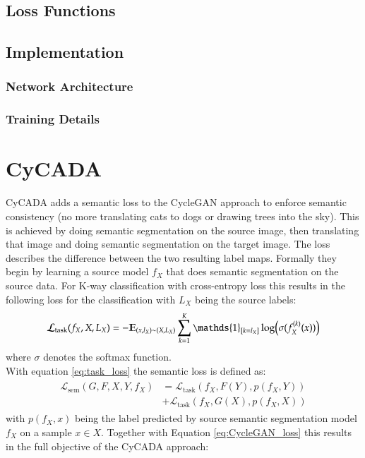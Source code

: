 \subsection{Loss Functions}
\subsection{Implementation}
\subsubsection{Network Architecture}
\subsubsection{Training Details}


\section{CyCADA} 
CyCADA \cite{DBLP:journals/corr/abs-1711-03213} adds a semantic loss to the CycleGAN approach to enforce semantic consistency (no more translating cats to dogs or drawing trees into the sky). This is achieved by doing semantic segmentation on the source image, then translating that image and doing semantic segmentation on the target image. The loss describes the difference between the two resulting label maps. Formally they begin by learning a source model $f_X$ that does semantic segmentation on the source data. For K-way classification with cross-entropy loss this results in the following loss for the classification with $L_X$ being the source labels:
\begin{align}
	\mathcal{L}_{\text{task}}(f_X, X, L_X) = -\mathbb{E}_{(x, l_X)\sim(X, L_X)}\sum_{k=1}^{K}\mathds{1}_{[k=l_X]}\log\Bigl(\sigma(f_X^{(k)}(x))\Bigr) \label{eq:task_loss} 
\end{align}
where $\sigma$ denotes the softmax function.\\
With equation \ref{eq:task_loss} the semantic loss is defined as:
\begin{align}
	\begin{split}
		\mathcal{L}_{\text{sem}}(G, F, X, Y, f_X) &= \mathcal{L}_{\text{task}}(f_X, F(Y), p(f_X, Y))\\
		&+ \mathcal{L}_{\text{task}}(f_X, G(X), p(f_X, X))
	\end{split}
\end{align}
with $p(f_X, x)$ being the label predicted by source semantic segmentation model $f_X$ on a sample $x \in X$. Together with Equation \ref{eq:CycleGAN_loss} this results in the full objective of the CyCADA approach:
